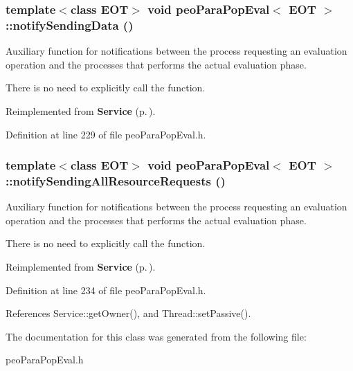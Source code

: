 \subsubsection{\setlength{\rightskip}{0pt plus 5cm}template$<$class EOT$>$ void {\bf peo\-Para\-Pop\-Eval}$<$ EOT $>$::notify\-Sending\-Data ()\hspace{0.3cm}{\tt  [virtual]}}\label{classpeo_para_pop_eval_1f78c3cec2940af08a059cc1aa96a9c8}


Auxiliary function for notifications between the process requesting an evaluation operation and the processes that performs the actual evaluation phase. 

There is no need to explicitly call the function. 

Reimplemented from {\bf Service} {\rm (p.\,\pageref{class_service_81ad4d6ebb50045b8977e2ab74826f30})}.

Definition at line 229 of file peo\-Para\-Pop\-Eval.h.
\subsubsection{\setlength{\rightskip}{0pt plus 5cm}template$<$class EOT$>$ void {\bf peo\-Para\-Pop\-Eval}$<$ EOT $>$::notify\-Sending\-All\-Resource\-Requests ()\hspace{0.3cm}{\tt  [virtual]}}\label{classpeo_para_pop_eval_b77031fc4807921ffaf7cf6b669a7665}


Auxiliary function for notifications between the process requesting an evaluation operation and the processes that performs the actual evaluation phase. 

There is no need to explicitly call the function. 

Reimplemented from {\bf Service} {\rm (p.\,\pageref{class_service_f94cc8a5c2665d4574041737e61e9ffc})}.

Definition at line 234 of file peo\-Para\-Pop\-Eval.h.

References Service::get\-Owner(), and Thread::set\-Passive().

The documentation for this class was generated from the following file:\begin{CompactItemize}
\item 
peo\-Para\-Pop\-Eval.h\end{CompactItemize}
